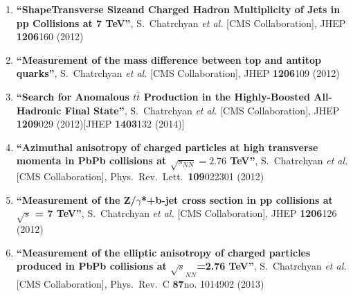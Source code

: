 \begin{enumerate}
\item%
{\bf ``ShapeTransverse Sizeand Charged Hadron Multiplicity of Jets in pp Collisions at 7 TeV''}, 
  S.~Chatrchyan {\it et al.}  [CMS Collaboration], 
JHEP {\bf 1206}160 (2012) %


\item%
{\bf ``Measurement of the mass difference between top and antitop quarks''}, 
  S.~Chatrchyan {\it et al.}  [CMS Collaboration], 
JHEP {\bf 1206}109 (2012) %


\item%
{\bf ``Search for Anomalous $t\bar{t}$ Production in the Highly-Boosted All-Hadronic Final State''}, 
  S.~Chatrchyan {\it et al.}  [CMS Collaboration], 
JHEP {\bf 1209}029 (2012)[JHEP {\bf 1403}132 (2014)] %


\item%
{\bf ``Azimuthal anisotropy of charged particles at high transverse momenta in PbPb collisions at $\sqrt{s_{NN}}=2.76$ TeV''}, 
  S.~Chatrchyan {\it et al.}  [CMS Collaboration], 
Phys.\ Rev.\ Lett.\  {\bf 109}022301 (2012) %


\item%
{\bf ``Measurement of the Z/$\gamma$*+b-jet cross section in pp collisions at $\sqrt{s}$ = 7 TeV''}, 
  S.~Chatrchyan {\it et al.}  [CMS Collaboration], 
JHEP {\bf 1206}126 (2012) %


\item%
{\bf ``Measurement of the elliptic anisotropy of charged particles produced in PbPb collisions at $\sqrt{s}_{NN}$=2.76 TeV''}, 
  S.~Chatrchyan {\it et al.}  [CMS Collaboration], 
Phys.\ Rev.\ C {\bf 87}no. 1014902 (2013) %



\end{enumerate}

